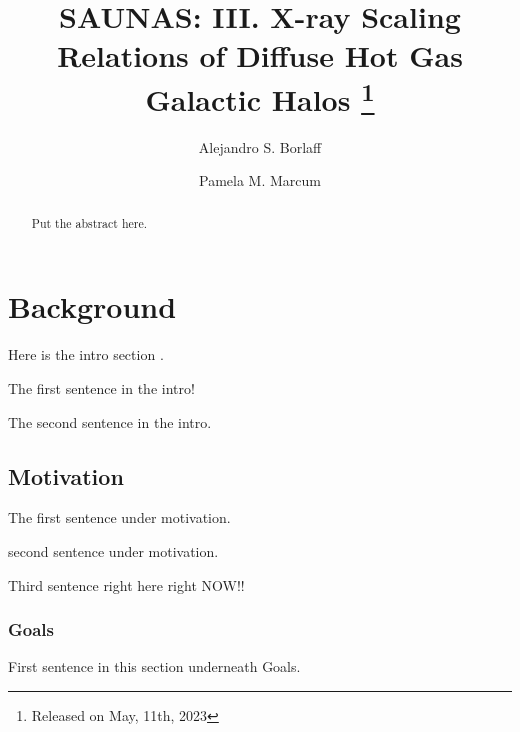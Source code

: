 \documentclass[modern]{aastex631}
\begin{document}
\title{\textbf{SAUNAS}: III. X-ray Scaling Relations of Diffuse Hot Gas Galactic Halos \footnote{Released on May, 11th, 2023}}
\author{Alejandro S. Borlaff}
\author{Pamela M. Marcum}

\begin{abstract}
Put the abstract here. 
\end{abstract}

\section{Background}
Here is the intro section \citep{aguerri+1998aj116_2136, bell+2006apj640_241,bell+2006apj652_270}. 

The first sentence in the intro! 

The second sentence in the intro.

\subsection{Motivation}

The first sentence under motivation.

second sentence under motivation.

Third sentence right here right NOW!! 

\subsubsection{Goals}
First sentence in this section underneath Goals. 

\begin{acknowledgements}

\end{acknowledgements}
\vspace{5mm}


% 
 

\end{document}
